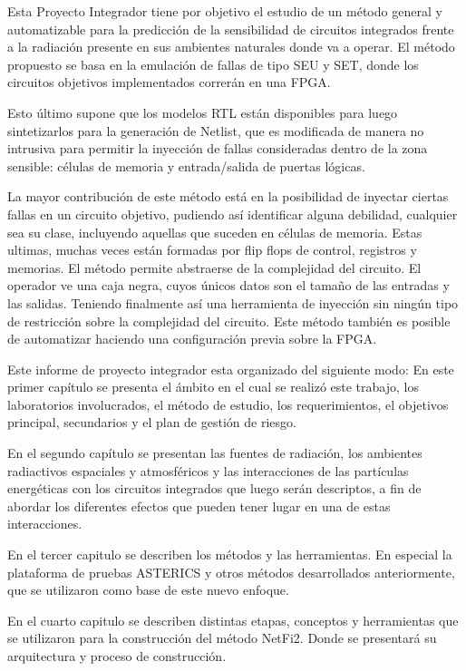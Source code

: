 \documentclass[a4paper,openright,12pt]{report}
\begin{document}
Esta Proyecto Integrador  tiene por objetivo el estudio de un método general y automatizable para la predicción de la sensibilidad de circuitos integrados frente a la radiación presente en sus ambientes naturales donde va a operar. El método propuesto se basa en la emulación de fallas de tipo SEU  y SET, donde los circuitos objetivos implementados correrán en una FPGA. 

Esto último supone que los modelos RTL están disponibles para luego sintetizarlos para la generación de Netlist, que es modificada de manera no intrusiva para permitir la inyección de fallas consideradas dentro de la zona sensible: células de memoria y entrada/salida de puertas lógicas.

La mayor contribución de este método está en la posibilidad  de inyectar ciertas fallas  en un circuito objetivo, pudiendo así identificar alguna debilidad, cualquier sea su clase, incluyendo aquellas que  suceden en células de memoria. Estas ultimas, muchas veces están formadas por flip flops de control, registros y  memorias. El método permite  abstraerse de la complejidad del circuito. El operador ve una caja negra, cuyos únicos datos son el tamaño de las entradas y las salidas. Teniendo finalmente así una herramienta de inyección  sin ningún tipo de restricción sobre la complejidad del circuito. Este método también es posible de automatizar haciendo una configuración previa sobre la FPGA.

Este informe de proyecto integrador esta organizado del siguiente modo: En este primer capítulo se presenta el ámbito en el cual se realizó este trabajo, los laboratorios involucrados, el método de estudio, los requerimientos, el objetivos principal, secundarios y el plan de gestión de riesgo.

En el segundo capítulo se presentan  las fuentes de  radiación, los ambientes radiactivos espaciales y atmosféricos y las interacciones de las partículas energéticas con los circuitos integrados que luego serán descriptos, a fin de abordar los diferentes efectos que pueden tener lugar en una de estas interacciones.

En el tercer capitulo se describen los métodos y las herramientas. En especial la plataforma de pruebas ASTERICS  y  otros métodos desarrollados anteriormente, que se utilizaron como base de este nuevo enfoque.

En el cuarto capitulo se describen distintas etapas, conceptos y herramientas que se utilizaron para la construcción del método NetFi2.  Donde se presentará su arquitectura y proceso de construcción.
\end{document}
